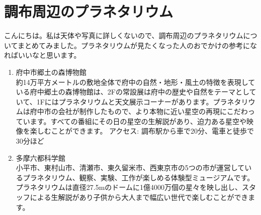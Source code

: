 \documentclass[supernova_2023]{subfiles}
\begin{document}
\chapter{調布周辺のプラネタリウム}

こんにちは。私は天体や写真に詳しくないので、調布周辺のプラネタリウムについてまとめてみました。プラネタリウムが見たくなった人のおでかけの参考になればいいなと思います。

\begin{enumerate}
  \item {}
  府中市郷土の森博物館\mbox{}\\約14万平方メートルの敷地全体で府中の自然・地形・風土の特徴を表現している府中郷土の森博物館は、2Fの常設展は府中の歴史や自然をテーマとしていて、1Fにはプラネタリウムと天文展示コーナーがあります。プラネタリウムは府中市の会社が制作したもので、より本物に近い星空の再現にこだわっています。すべての番組にその日の星空の生解説があり、迫力ある星空や映像を楽しむことができます。
  \vspace{-\zw}アクセス: 調布駅から車で20分、電車と徒歩で30分ほど
  \vspace{\zw}
  \item {}
  多摩六都科学館\mbox{}\\小平市、東村山市、清瀬市、東久留米市、西東京市の5つの市が運営しているプラネタリウム、観察、実験、工作が楽しめる体験型ミュージアムです。プラネタリウムは直径27.5mのドームに1億4000万個の星々を映し出し、スタッフによる生解説があり子供から大人まで幅広い世代で楽しむことができます。
\end{enumerate}
\end{document}
